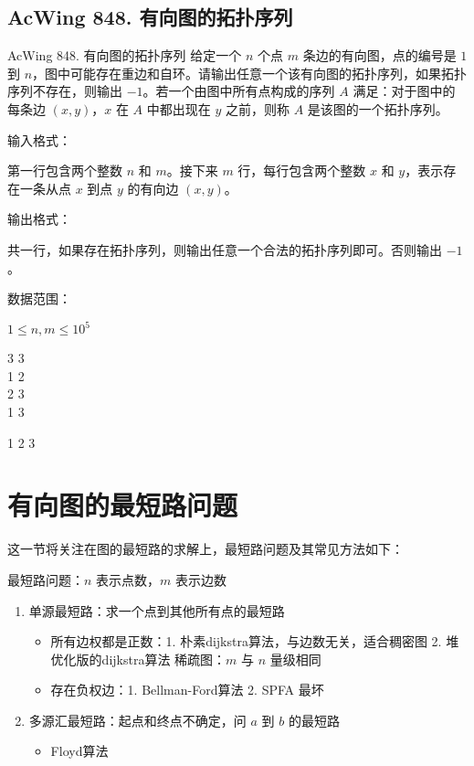 \subsection{AcWing 848. 有向图的拓扑序列}
\begin{titledbox}{AcWing 848. 有向图的拓扑序列}
给定一个 $n$ 个点 $m$ 条边的有向图，点的编号是 $1$ 到 $n$，图中可能存在重边和自环。请输出任意一个该有向图的拓扑序列，如果拓扑序列不存在，则输出 $-1$。若一个由图中所有点构成的序列 $A$ 满足：对于图中的每条边 $(x, y)$，$x$ 在 $A$ 中都出现在 $y$ 之前，则称 $A$ 是该图的一个拓扑序列。

输入格式：

第一行包含两个整数 $n$ 和 $m$。接下来 $m$ 行，每行包含两个整数 $x$ 和 $y$，表示存在一条从点 $x$ 到点 $y$ 的有向边 $(x, y)$。

输出格式：

共一行，如果存在拓扑序列，则输出任意一个合法的拓扑序列即可。否则输出 $-1$。

数据范围：

$1 \le n,m \le 10^5$

\begin{inputblock}
    3 3 \\
    1 2 \\
    2 3 \\
    1 3 \\
\end{inputblock}
\begin{outputblock}
    1 2 3
\end{outputblock}
\end{titledbox}

\section{有向图的最短路问题}
这一节将关注在图的最短路的求解上，最短路问题及其常见方法如下：

最短路问题：$n$ 表示点数，$m$ 表示边数

\begin{enumerate}
    \item 单源最短路：求一个点到其他所有点的最短路
        \begin{itemize}
            \item 所有边权都是正数：1. 朴素dijkstra算法，与边数无关，适合稠密图 2. 堆优化版的dijkstra算法  稀疏图：$m$ 与 $n$ 量级相同
            \item 存在负权边：1. Bellman-Ford算法  2. SPFA 最坏 
        \end{itemize}
    \item 多源汇最短路：起点和终点不确定，问 $a$ 到 $b$ 的最短路
        \begin{itemize}
            \item Floyd算法 
        \end{itemize}
\end{enumerate}

